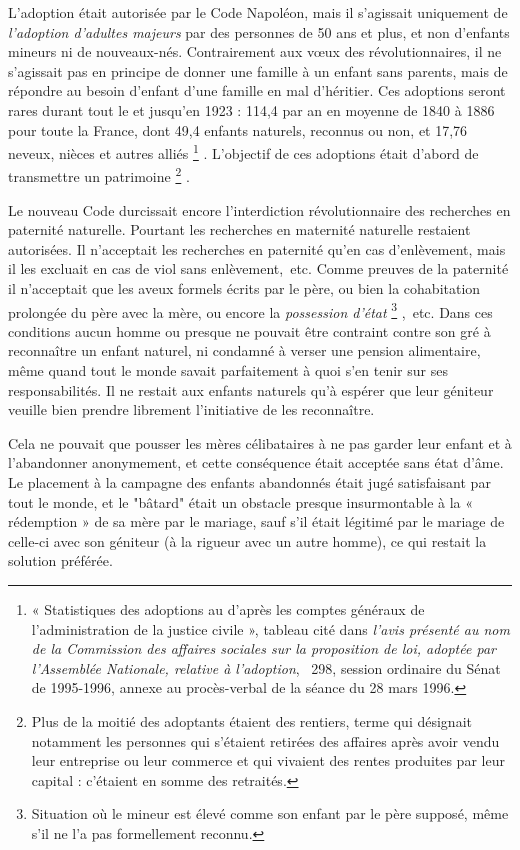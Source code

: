  L'adoption était autorisée par le Code Napoléon, mais il s'agissait uniquement de \emph{l'adoption d'adultes majeurs} par des personnes de 50 ans et plus, et non d'enfants mineurs ni de nouveaux-nés. Contrairement aux vœux des révolutionnaires, il ne s'agissait pas en principe de donner une famille à un enfant sans parents, mais de répondre au besoin d'enfant d'une famille en mal d'héritier. Ces adoptions seront rares durant tout le  et jusqu'en 1923 : 114,4 par an en moyenne de 1840 à 1886 pour toute la France, dont 49,4 enfants naturels, reconnus ou non, et 17,76 neveux, nièces et autres alliés
\footnote{« Statistiques des adoptions au  d'après les comptes généraux de l'administration de la justice civile », tableau cité dans \emph{l'avis présenté au nom de la Commission des affaires sociales sur la proposition de loi, adoptée par l'Assemblée Nationale, relative à l'adoption}, \no~298, session ordinaire du Sénat de 1995-1996, annexe au procès-verbal de la séance du 28 mars 1996.}
. L'objectif de ces adoptions était d'abord de transmettre un patrimoine
\footnote{Plus de la moitié des adoptants étaient des rentiers, terme qui désignait notamment les personnes qui s'étaient retirées des affaires après avoir vendu leur entreprise ou leur commerce et qui vivaient des rentes produites par leur capital : c'étaient en somme des retraités.}
. 

 Le nouveau Code durcissait encore l'interdiction révolutionnaire des recherches en paternité naturelle. Pourtant les recherches en maternité naturelle restaient autorisées. Il n'acceptait les recherches en paternité qu'en cas d'enlèvement, mais il les excluait en cas de viol sans enlèvement,~etc. Comme preuves de la paternité il n'acceptait que les aveux formels écrits par le père, ou bien la cohabitation prolongée du père avec la mère, ou encore la \emph{possession d'état}%
\footnote{Situation où le mineur est élevé comme son enfant par le père supposé, même s'il ne l'a pas formellement reconnu.}%
,~etc. Dans ces conditions aucun homme ou presque ne pouvait être contraint contre son gré à reconnaître un enfant naturel, ni condamné à verser une pension alimentaire, même quand tout le monde savait parfaitement à quoi s'en tenir sur ses responsabilités. Il ne restait aux enfants naturels qu'à espérer que leur géniteur veuille bien prendre librement l'initiative de les reconnaître. 

 Cela ne pouvait que pousser les mères célibataires à ne pas garder leur enfant et à l'abandonner anonymement, et cette conséquence était acceptée sans état d'âme. Le placement à la campagne des enfants abandonnés était jugé satisfaisant par tout le monde, et le "bâtard" était un obstacle presque insurmontable à la « rédemption » de sa mère par le mariage, sauf s'il était légitimé par le mariage de celle-ci avec son géniteur (à la rigueur avec un autre homme), ce qui restait la solution préférée. 


